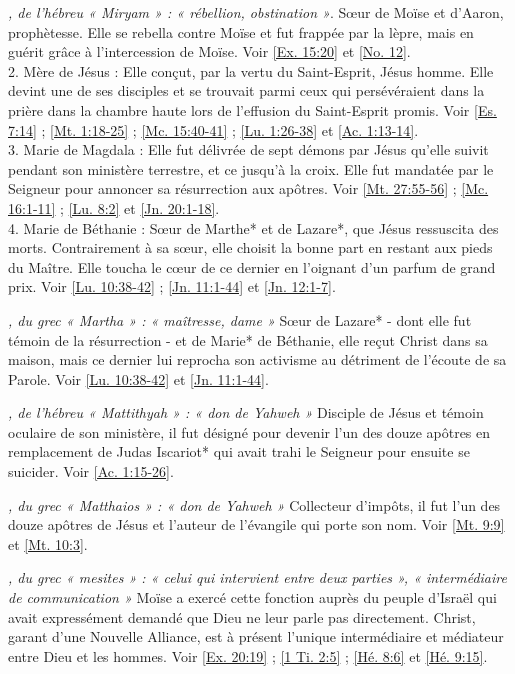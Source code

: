 \begin{multicols}{2}
\textit{, de l'hébreu « Miryam » : « rébellion, obstination »}. Sœur de Moïse et d'Aaron, prophètesse. Elle se rebella contre Moïse et fut frappée par la lèpre, mais en guérit grâce à l'intercession de Moïse. Voir \vref{Ex. 15:20} et \vref{No. 12}.
\\2. Mère de Jésus : Elle conçut, par la vertu du Saint-Esprit, Jésus homme. Elle devint une de ses disciples et se trouvait parmi ceux qui persévéraient dans la prière dans la chambre haute lors de l'effusion du Saint-Esprit promis. Voir \vref{Es. 7:14} ; \vref{Mt. 1:18-25} ; \vref{Mc. 15:40-41} ; \vref{Lu. 1:26-38} et \vref{Ac. 1:13-14}.
\\3. Marie de Magdala : Elle fut délivrée de sept démons par Jésus qu'elle suivit pendant son ministère terrestre, et ce jusqu'à la croix. Elle fut mandatée par le Seigneur pour annoncer sa résurrection aux apôtres. Voir \vref{Mt. 27:55-56} ; \vref{Mc. 16:1-11} ; \vref{Lu. 8:2} et \vref{Jn. 20:1-18}.
\\4. Marie de Béthanie : Sœur de Marthe* et de Lazare*, que Jésus ressuscita des morts. Contrairement à sa sœur, elle choisit la bonne part en restant aux pieds du Maître. Elle toucha le cœur de ce dernier en l'oignant d'un parfum de grand prix. Voir \vref{Lu. 10:38-42} ; \vref{Jn. 11:1-44} et \vref{Jn. 12:1-7}.

\textit{, du grec « Martha » : « maîtresse, dame »}\newline
Sœur de Lazare* - dont elle fut témoin de la résurrection - et de Marie* de Béthanie, elle reçut Christ dans sa maison, mais ce dernier lui reprocha son activisme au détriment de l'écoute de sa Parole. Voir \vref{Lu. 10:38-42} et \vref{Jn. 11:1-44}.

\textit{, de l'hébreu « Mattithyah » : « don de Yahweh »}\newline
Disciple de Jésus et témoin oculaire de son ministère, il fut désigné pour devenir l'un des douze apôtres en remplacement de Judas Iscariot* qui avait trahi le Seigneur pour ensuite se suicider. Voir \vref{Ac. 1:15-26}.

\textit{, du grec « Matthaios » : « don de Yahweh »}\newline
Collecteur d'impôts, il fut l'un des douze apôtres de Jésus et l'auteur de l'évangile qui porte son nom. Voir \vref{Mt. 9:9} et \vref{Mt. 10:3}.

\textit{, du grec « mesites » : « celui qui intervient entre deux parties », « intermédiaire de communication »}\newline
Moïse a exercé cette fonction auprès du peuple d'Israël qui avait expressément demandé que Dieu ne leur parle pas directement. Christ, garant d'une Nouvelle Alliance, est à présent l'unique intermédiaire et médiateur entre Dieu et les hommes. Voir \vref{Ex. 20:19} ; \vref{1 Ti. 2:5} ; \vref{Hé. 8:6} et \vref{Hé. 9:15}.


\end{multicols}
